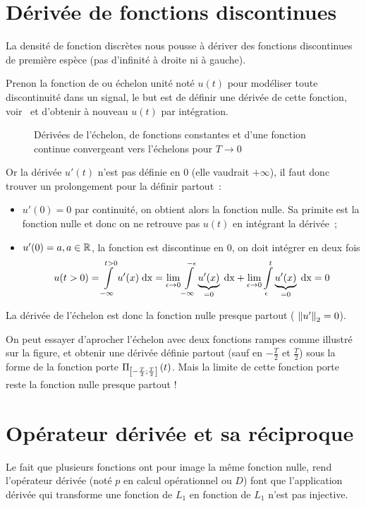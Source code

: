 \section{Dérivée de fonctions discontinues}
\label{sec:deriv_discontinues}
La densité de fonction discrètes nous pousse à dériver des fonctions
discontinues de première espèce (pas d'infinité à droite ni à gauche). 

Prenon la fonction de \Heaviside{} ou échelon unité noté $u(t)$ pour
modéliser toute discontinuité dans un signal, le but est de définir
une dérivée de cette fonction, voir~ et
d'obtenir à nouveau $u(t)$ par intégration.

\begin{figure}[ht!]
  \centering
  \caption{Dérivées de l'échelon, de fonctions constantes et d'une fonction continue convergeant vers l'échelons pour $T\to0$}
  \label{fig:derivee_echelon}
\end{figure}

Or la dérivée $u'(t)$ n'est pas définie en $0$ (elle vaudrait $+\infty$), il faut donc trouver un prolongement pour la définir partout~:
\begin{itemize}
\item $u'(0)=0$ par continuité, on obtient alors la fonction nulle. Sa primite est la fonction nulle et donc on ne retrouve pas $u(t)$ en intégrant la dérivée~;
\item $u'(0)=a, a\in \mathbb{R}$, la fonction est discontinue en $0$, on doit intégrer en deux fois $$u(t>0)=\int\limits_{-\infty}^{t>0}{u'(x)\;\mathrm{d{x}}}=\lim\limits_{\epsilon\to 0}\int\limits_{-\infty}^{-\epsilon}{\underbrace{u'(x)}_{=0}\;\mathrm{d{x}}}+\lim\limits_{\epsilon\to 0}\int\limits_{\epsilon}^{t}{\underbrace{u'(x)}_{=0}\;\mathrm{d{x}}}=0$$ 
\end{itemize}

La dérivée de l'échelon est donc la fonction nulle \og{} presque partout \fg{} ( $\left\|u'\right\|_2=0$).

On peut essayer d'aprocher l'échelon avec deux fonctions rampes comme
illustré sur la figure, et obtenir une dérivée définie partout (sauf
en $-\frac{T}{2}$ et $\frac{T}{2}$) sous la forme de la fonction porte
$\Pi_{\left[-\frac{T}{2} ; \frac{T}{2}\right]}\left(t\right)$. Mais la limite de cette
fonction porte reste la fonction nulle presque partout !


\section{Opérateur dérivée et sa réciproque}
\label{sec:dirac_derivee}
Le fait que plusieurs fonctions ont pour image la même fonction
nulle, rend l'opérateur dérivée (noté $p$ en calcul opérationnel ou
$D$) font que l'application dérivée qui transforme une fonction de
$L_1$ en fonction de $L_1$ n'est pas injective.

